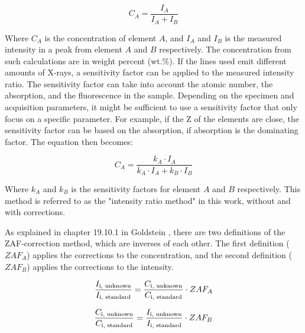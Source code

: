 \begin{equation}
    \label{eq:theory:quantitative:area_ratio}
    C_A = \frac{I_A}{I_A + I_B}
\end{equation}

Where $C_A$ is the concentration of element $A$, and $I_A$ and $I_B$ is the measured intensity in a peak from element $A$ and $B$ respectively.
The concentration from such calculations are in weight percent (wt.\%).
If the lines used emit different amounts of X-rays, a sensitivity factor can be applied to the measured intensity ratio.
The sensitivity factor can take into account the atomic number, the absorption, and the fluorescence in the sample.
Depending on the specimen and acquisition parameters, it might be sufficient to use a sensitivity factor that only focus on a specific parameter.
For example, if the Z of the elements are close, the sensitivity factor can be based on the absorption, if absorption is the dominating factor.
The equation then becomes:

\begin{equation}
    \label{eq:theory:quantitative:area_ratio_corrected}
    C_A = \frac{k_A \cdot I_A}{k_A \cdot I_A + k_B \cdot I_B}
\end{equation}

Where $k_A$ and $k_B$ is the sensitivity factors for element $A$ and $B$ respectively.
This method is referred to as the "intensity ratio method" in this work, without and with corrections.





As explained in chapter 19.10.1 in Goldstein \cite[Ch. 19.10.1]{goldstein_scanning_2018}, there are two definitions of the ZAF-correction method, which are inverses of each other.
The first definition ($ZAF_A$) applies the corrections to the concentration, and the second definition ($ZAF_B$) applies the corrections to the intensity.


\begin{equation}
    \label{eq:theory:quantitative:zaf_a}
    \frac{I_\textnormal{i, unknown}}{I_\textnormal{i, standard}}  = \frac{C_\textnormal{i, unknown}}{C_\textnormal{i, standard}}\cdot ZAF_A
\end{equation}

\begin{equation}
    \label{eq:theory:quantitative:zaf_b}
    \frac{C_\textnormal{i, unknown}}{C_\textnormal{i, standard}} = \frac{I_\textnormal{i, unknown}}{I_\textnormal{i, standard}} \cdot ZAF_B
\end{equation}

